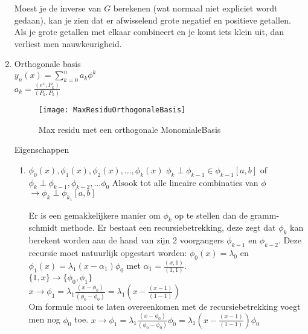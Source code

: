 \begin{enumerate}
Moest je de inverse van $G$ berekenen (wat normaal niet expliciet wordt gedaan), kan je zien dat er afwisselend grote negatief en positieve getallen. Als je grote getallen met elkaar combineert en je komt iets klein uit, dan verliest men nauwkeurigheid.
\item Orthogonale basis \\
$y_n(x)= \sum_{k=0}^n a_k \phi^k$ \\
$a_k = \frac{(e^x,P_k)}{(P_k,P_k)}$ \\

\begin{figure}[h]
	\centering
	\texttt{[image: MaxResiduOrthogonaleBasis]}
	\caption{Max residu met een orthogonale MonomialeBasis}
\end{figure}


Eigenschappen 
\begin{enumerate}
\item 
$\phi_0(x),\phi_1(x),\phi_2(x),\ldots,\phi_k(x)$
$\phi_k \perp \phi_{k-1} \in \phi_{k-1}[a,b]$ of $ \phi_k \perp \phi_{k-1},\phi_{k-2},\ldots \phi_0$ Alsook tot alle lineaire combinaties van $\phi$ $\rightarrow \phi_k \perp \phi_{k_1}[a,b]$

Er is een gemakkelijkere manier om $\phi_k$ op te stellen dan de gramm-schmidt methode. Er bestaat een recursiebetrekking, deze zegt dat $\phi_k$ kan berekent worden aan de hand van zijn 2 voorgangers  $\phi_{k-1}$ en $\phi_{k-2}$. Deze recursie moet natuurlijk opgestart worden: $\phi_0(x)=\lambda_0$ en  $\phi_1(x)=\lambda_1(x-\alpha_1)\phi_0$ met $\alpha_1 = \frac{(x,1)}{(1,1)}$. \\
$\{1,x\} \rightarrow \{\phi_0,\phi_1\}$ \\
$x \rightarrow \phi_1 = \lambda_1 \frac{( x- \phi_0)}{( \phi_0- \phi_0)}= \lambda_1 (x-\frac{( x- 1)}{( 1-1)})$ \\ Om formule mooi te laten overeenkomen met de recursiebetrekking voegt men nog $\phi_0$ toe.
$x \rightarrow \phi_1 = \lambda_1 \frac{( x- \phi_0)}{( \phi_0- \phi_0)}\phi_0 = \lambda_1 (x-\frac{( x- 1)}{( 1-1)})\phi_0 $ \\


\end{enumerate}
\end{enumerate}
